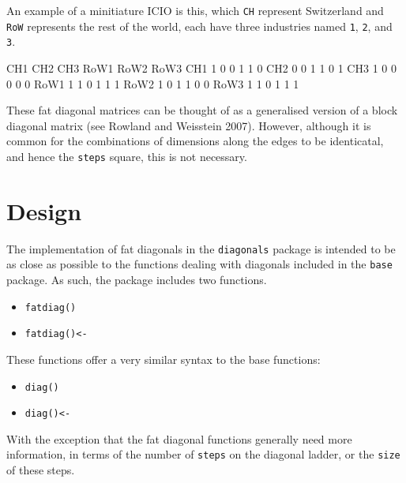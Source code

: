 \documentclass[article]{jss}
\begin{document}
An example of a minitiature ICIO is this, which \texttt{CH} represent
Switzerland and \texttt{RoW} represents the rest of the world, each have
three industries named \texttt{1}, \texttt{2}, and \texttt{3}.

\begin{CodeChunk}
\begin{CodeOutput}
     CH1 CH2 CH3 RoW1 RoW2 RoW3
CH1    1   0   0    1    1    0
CH2    0   0   1    1    0    1
CH3    1   0   0    0    0    0
RoW1   1   1   0    1    1    1
RoW2   1   0   1    1    0    0
RoW3   1   1   0    1    1    1
\end{CodeOutput}
\end{CodeChunk}

These fat diagonal matrices can be thought of as a generalised version
of a block diagonal matrix (see Rowland and Weisstein 2007). However,
although it is common for the combinations of dimensions along the edges
to be identicatal, and hence the \texttt{steps} square, this is not
necessary.

\section{Design}\label{design}

The implementation of fat diagonals in the \texttt{diagonals} package is
intended to be as close as possible to the functions dealing with
diagonals included in the \texttt{base} package. As such, the package
includes two functions.

\begin{itemize}
\itemsep1pt\parskip0pt
\item
  \texttt{fatdiag()}
\item
  \texttt{fatdiag()\textless{}-}
\end{itemize}

These functions offer a very similar syntax to the base functions:

\begin{itemize}
\itemsep1pt\parskip0pt
\item
  \texttt{diag()}
\item
  \texttt{diag()\textless{}-}
\end{itemize}

With the exception that the fat diagonal functions generally need more
information, in terms of the number of \texttt{steps} on the diagonal
ladder, or the \texttt{size} of these steps.
\end{document}
